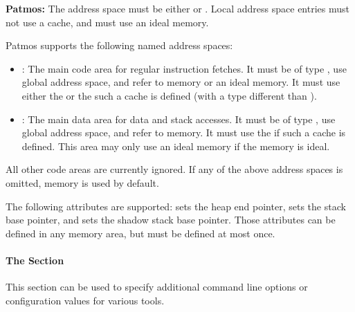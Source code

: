 \begin{itemize}
  \begin{framed}
  \textbf{Patmos:} The address space must be either  or . Local address space entries must not
  use a cache, and must use an ideal memory.

  Patmos supports the following named address spaces: 
  
  \begin{itemize}
  \item {}: The main code area for regular instruction fetches. It must be of type , use global address space, and refer to
                      memory or an ideal memory. It must use either the  or the  such
		     a cache is defined (with a type different than ).
  \item {}: The main data area for data and stack accesses. It must be of type , use global address space, and refer to
                      memory. It must use the  if such a cache is defined. This area may
		     only use an ideal memory if the  memory is ideal.
  \end{itemize}

  All other code areas are currently ignored. If any of the above address spaces is omitted,  memory is used
  by default.


  The following attributes are supported:  sets the heap end pointer,  sets the stack
  base pointer, and  sets the shadow stack base pointer. Those attributes can be defined in
  any memory area, but must be defined at most once.
  \end{framed}

\end{itemize}


\paragraph{The  Section}

This section can be used to specify additional command line options or configuration values for various tools.

